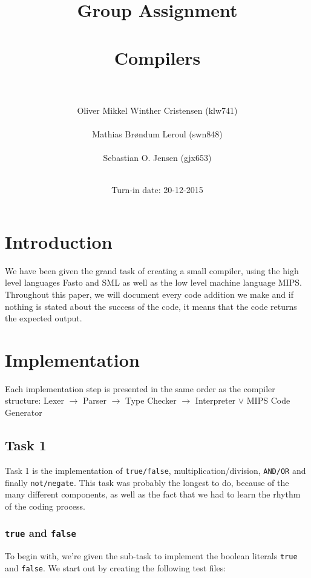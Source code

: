 \documentclass[a4paper]{article}
\title{Group Assignment\\ \ \\Compilers\\ \ \\}
\author{Oliver Mikkel Winther Cristensen (klw741) \\ \ \\Mathias Brøndum Leroul (swn848)\\ \ \\Sebastian O. Jensen (gjx653)\\ \ \\}
\date{Turn-in date: 20-12-2015}
\begin{document}
\maketitle
\newpage

\tableofcontents
\newpage

\section{Introduction}
	We have been given the grand task of creating a small compiler, using the high level languages Fasto and SML as well as the low level machine language MIPS. Throughout this paper, we will document every code addition we make and if nothing is stated about the success of the code, it means that the code returns the expected output.
	
\section{Implementation}
	Each implementation step is presented in the same order as the compiler structure: Lexer $\rightarrow$ Parser $\rightarrow$ Type Checker $\rightarrow$ Interpreter $\vee$ MIPS Code Generator
\subsection{Task 1}
	Task 1 is the implementation of \texttt{true/false}, multiplication/division, \texttt{AND/OR} and finally \texttt{not/negate}. This task was probably the longest to do, because of the many different components, as well as the fact that we had to learn the rhythm of the coding process.
	
\subsubsection{\texttt{true} and \texttt{false}}

	To begin with, we're given the sub-task to implement the boolean literals \texttt{true} and \texttt{false}. We start out by creating the following test files:
	
\end{document}
